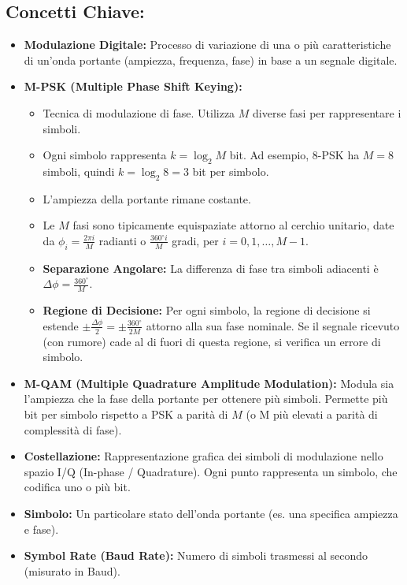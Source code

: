 \subsection{Concetti Chiave:}
\begin{itemize}
    \item \textbf{Modulazione Digitale:} Processo di variazione di una o più caratteristiche di un'onda portante (ampiezza, frequenza, fase) in base a un segnale digitale.
    \item \textbf{M-PSK (Multiple Phase Shift Keying):}
    \begin{itemize}
        \item Tecnica di modulazione di fase. Utilizza $M$ diverse fasi per rappresentare i simboli.
        \item Ogni simbolo rappresenta $k = \log_2 M$ bit. Ad esempio, 8-PSK ha $M=8$ simboli, quindi $k=\log_2 8 = 3$ bit per simbolo.
        \item L'ampiezza della portante rimane costante.
        \item Le $M$ fasi sono tipicamente equispaziate attorno al cerchio unitario, date da $\phi_i = \frac{2\pi i}{M}$ radianti o $\frac{360^\circ i}{M}$ gradi, per $i = 0, 1, \ldots, M-1$.
        \item \textbf{Separazione Angolare:} La differenza di fase tra simboli adiacenti è $\Delta\phi = \frac{360^\circ}{M}$.
        \item \textbf{Regione di Decisione:} Per ogni simbolo, la regione di decisione si estende $\pm \frac{\Delta\phi}{2} = \pm \frac{360^\circ}{2M}$ attorno alla sua fase nominale. Se il segnale ricevuto (con rumore) cade al di fuori di questa regione, si verifica un errore di simbolo.
    \end{itemize}
    \item \textbf{M-QAM (Multiple Quadrature Amplitude Modulation):} Modula sia l'ampiezza che la fase della portante per ottenere più simboli. Permette più bit per simbolo rispetto a PSK a parità di $M$ (o M più elevati a parità di complessità di fase).
    \item \textbf{Costellazione:} Rappresentazione grafica dei simboli di modulazione nello spazio I/Q (In-phase / Quadrature). Ogni punto rappresenta un simbolo, che codifica uno o più bit.
    \item \textbf{Simbolo:} Un particolare stato dell'onda portante (es. una specifica ampiezza e fase).
    \item \textbf{Symbol Rate (Baud Rate):} Numero di simboli trasmessi al secondo (misurato in Baud).

\end{itemize}
